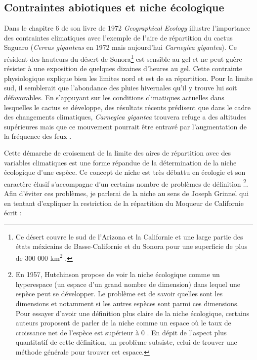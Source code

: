 \subsection*{Contraintes abiotiques et niche
écologique}\label{contraintes-abiotiques-et-niche-uxe9cologique}

Dans le chapitre 6 de son livre de 1972 \emph{Geographical Ecology}
\citep{macarthur1972geographical} illustre l'importance des contraintes
climatiques avec l'exemple de l'aire de répartition du cactus Saguaro
(\emph{Cereus giganteus} en 1972 mais aujourd'hui \emph{Carnegiea
gigantea}). Ce résident des hauteurs du désert de Sonora\footnote{Ce
  désert couvre le sud de l'Arizona et la Californie et une large partie
  des états méxicains de Basse-Californie et du Sonora pour une
  superficie de plus de 300 000 km\textsuperscript{2} .} est sensible au
gel et ne peut guère résister à une exposition de quelques dizaines
d'heures au gel. Cette contrainte physiologique explique bien les
limites nord et est de sa répartition. Pour la limite sud, il semblerait
que l'abondance des pluies hivernales qu'il y trouve lui soit
défavorables. En s'appuyant sur les conditions climatiques actuelles
dans lesquelles le cactus se développe, des résultats récents prédisent
que dans le cadre des changements climatiques, \emph{Carnegiea gigantea}
trouvera refuge a des altitudes supérieures mais que ce mouvement
pourrait être entravé par l'augmentation de la fréquence des feux
\citep{Springer2015}.

Cette démarche de croisement de la limite des aires de répartition avec
des variables climatiques est une forme répandue de la détermination de
la niche écologique d'une espèce. Ce concept de niche est très débattu
en écologie et son caractère élusif s'accompagne d'un certains nombre de
problèmes de définition \footnote{En 1957, Hutchinson propose de voir la
  niche écologique comme un hyperespace (un espace d'un grand nombre de
  dimension) dans lequel une espèce peut se développer. Le problème est
  de savoir quelles sont les dimensions et notamment si les autres
  espèces sont parmi ces dimensions. Pour essayer d'avoir une définition
  plus claire de la niche écologique, certains auteurs proposent de
  parler de la niche comme un espace où le taux de croissance net de
  l'espèce est supérieur à 0 \citep{Chase2003}. En dépit de l'aspect
  plus quantitatif de cette définition, un problème subsiste, celui de
  trouver une méthode générale pour trouver cet espace.}. Afin d'éviter
ces problèmes, je parlerai de la niche au sens de Joseph Grinnel qui en
tentant d'expliquer la restriction de la répartition du Moqueur de
Californie écrit :

